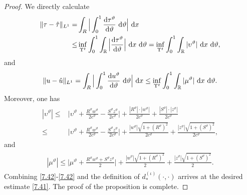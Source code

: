 \documentclass[11pt,reqno]{article}
\newcommand{\fr}{\frac}
\numberwithin{equation}{section}
\begin{document}
\begin{proof}
We directly calculate
\begin{align}\label{7.42}
\begin{split}
\|\tau-\hat{\tau}\|_{L^1} =&\int_{R}\Big|\int_{0}^1\fr{{\rm d}\tau^\vartheta}{{\rm d}\vartheta}\ {\rm d}\vartheta\Big|\ {\rm d}x \\
\leq & \inf_{\Upsilon^t}\int_{0}^1\int_{\mathbb{R}}\Big|\fr{{\rm d}\tau^\vartheta}{{\rm d}\vartheta}\Big|\ {\rm d}x\ {\rm d}\vartheta
= \inf_{\Upsilon^t}\int_{0}^1\int_{\mathbb{R}}|\upsilon^\vartheta|\ {\rm d}x\ {\rm d}\vartheta,
\end{split}
\end{align}
and
\begin{align}\label{7.43}
\begin{split}
\|u-\hat{u}\|_{L^1}=\int_{R}\Big|\int_{0}^1\fr{{\rm d}u^\vartheta}{{\rm d}\vartheta}\ {\rm d}\vartheta\Big|\ {\rm d}x \leq \inf_{\Upsilon^t}\int_{0}^1\int_{\mathbb{R}}|\mu^\vartheta|\ {\rm d}x\ {\rm d}\vartheta.
\end{split}
\end{align}
Moreover, one has
\begin{align}\label{7.44}
\begin{split}
|\upsilon^\vartheta|\leq & \Big|\upsilon^\vartheta +\fr{R^\vartheta w^\vartheta}{2c^\vartheta}-\fr{S^\vartheta z^\vartheta}{2c^\vartheta}\Big| +\fr{|R^\vartheta|\cdot|w^\vartheta|}{2c^\vartheta} +\fr{|S^\vartheta|\cdot|z^\vartheta|}{2c^\vartheta} \\
\leq & \Big|\upsilon^\vartheta +\fr{R^\vartheta w^\vartheta}{2c^\vartheta}-\fr{S^\vartheta z^\vartheta}{2c^\vartheta}\Big| +\fr{|w^\vartheta|\sqrt{1+(R^\vartheta)^2}}{2c^\vartheta} +\fr{|z^\vartheta|\sqrt{1+(S^\vartheta)^2}}{2c^\vartheta},
\end{split}
\end{align}
and
\begin{align}\label{7.45}
\begin{split}
|\mu^\vartheta|\leq  \Big|\mu^\vartheta +\fr{R^\vartheta w^\vartheta +S^\vartheta z^\vartheta}{2}\Big| +\fr{|w^\vartheta|\sqrt{1+(R^\vartheta)^2}}{2} +\fr{|z^\vartheta|\sqrt{1+(S^\vartheta)^2}}{2}.
\end{split}
\end{align}
Combining \eqref{7.42}-\eqref{7.42} and the definition of $d_{*}^{(\iota)}(\cdot, \cdot)$ arrives at the desired estimate \eqref{7.41}. The proof of the proposition is complete.
\end{proof}
\end{document}
